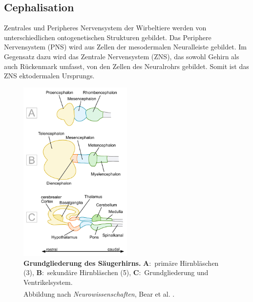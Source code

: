 \documentclass[12pt,a4paper,pdftex]{article}
\begin{document}
\subsection{Cephalisation}
\label{subsec:Cephalisation} 
Zentrales und Peripheres Nervensystem der Wirbeltiere werden von unterschiedlichen ontogenetischen Strukturen gebildet. Das Periphere Nervensystem (PNS) wird aus Zellen der mesodermalen Neuralleiste gebildet. Im Gegensatz dazu wird das Zentrale Nervensystem (ZNS), das sowohl Gehirn als auch Rückenmark umfasst, von den Zellen des Neuralrohrs gebildet. Somit ist das ZNS ektodermalen Ursprungs. \\

\begin{figure}[H]
\centering
\includegraphics[width=0.5\textwidth]{pictures/Bilder_Jule/Andere/cephalisation.png}
\caption[Grundgliederung des Säugerhirns]{\textbf{Grundgliederung des Säugerhirns.} \textbf{A}:~primäre Hirnbläschen (3), \textbf{B}:~sekundäre Hirnbläschen (5), \textbf{C}:~Grundgliederung und Ventrikelsystem. \\
Abbildung nach \textit{Neurowissenschaften}, Bear et al. \textsuperscript{\cite[7]{neurowissenschaften_baer}}.}
\label{fig:cephalisation}
\end{figure}
\end{document}
